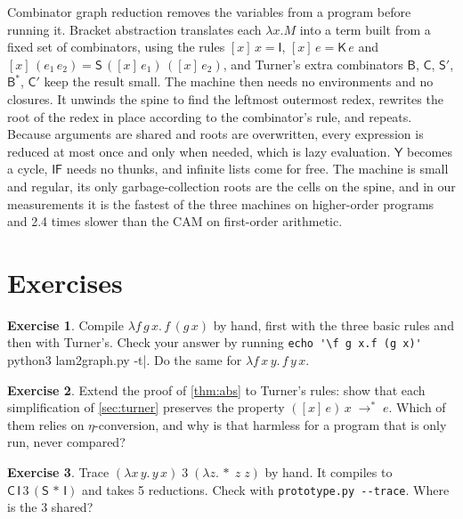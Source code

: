 \documentclass[11pt,a4paper]{article}
\newcommand{\cmb}[1]{\textsf{#1}}
\newcommand{\I}{\cmb{I}}
\newcommand{\K}{\cmb{K}}
\newcommand{\Sc}{\cmb{S}}
\newcommand{\B}{\cmb{B}}
\newcommand{\C}{\cmb{C}}
\newcommand{\Sp}{\cmb{S}'}
\newcommand{\Bs}{\cmb{B}^{*}}
\newcommand{\Cp}{\cmb{C}'}
\newcommand{\Y}{\cmb{Y}}
\newcommand{\IF}{\cmb{IF}}
\newcommand{\abs}[2]{[#1]\,#2}
\newcommand{\reds}{\;\to^{*}\;}
\theoremstyle{definition}
\newtheorem{exercise}{Exercise}
\theoremstyle{plain}
\begin{document}
Combinator graph reduction removes the variables from a program before
running it. Bracket abstraction translates each $\lambda x.M$ into a term built
from a fixed set of combinators, using the rules $\abs{x}{x} = \I$,
$\abs{x}{e} = \K\,e$ and $\abs{x}{(e_1\,e_2)} = \Sc\,(\abs{x}{e_1})\,(\abs{x}{e_2})$,
and Turner's extra combinators $\B$, $\C$, $\Sp$, $\Bs$, $\Cp$ keep the result
small. The machine then needs no environments and no closures. It unwinds the
spine to find the leftmost outermost redex, rewrites the root of the redex in
place according to the combinator's rule, and repeats. Because arguments are
shared and roots are overwritten, every expression is reduced at most once and
only when needed, which is lazy evaluation. $\Y$ becomes a cycle, $\IF$ needs
no thunks, and infinite lists come for free. The machine is small and
regular, its only garbage-collection roots are the cells on the spine, and in
our measurements it is the fastest of the three machines on higher-order
programs and 2.4 times slower than the CAM on first-order arithmetic.

\section*{Exercises}

\begin{exercise}
Compile $\lambda f\,g\,x.\,f\,(g\,x)$ by hand, first with the three basic
rules and then with Turner's. Check your answer by running
\verb|echo '\f g x.f (g x)' | python3 lam2graph.py -t|. Do the same for
$\lambda f\,x\,y.\,f\,y\,x$.
\end{exercise}

\begin{exercise}
Extend the proof of \cref{thm:abs} to Turner's rules: show that each
simplification of \cref{sec:turner} preserves the property
$(\abs{x}{e})\,x \reds e$. Which of them relies on $\eta$-conversion, and why
is that harmless for a program that is only run, never compared?
\end{exercise}

\begin{exercise}
Trace $(\lambda x\,y.\,y\,x)\;3\;(\lambda z.\,{*}\;z\;z)$ by hand. It compiles
to $\C\,\I\,3\,(\Sc\,{*}\,\I)$ and takes 5 reductions. Check with
\texttt{prototype.py -{}-trace}. Where is the 3 shared?
\end{exercise}
\end{document}
